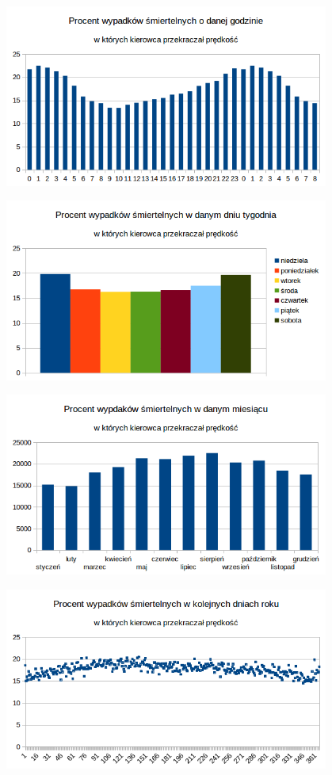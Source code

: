 \centerline{\includegraphics[width=0.8\textwidth]{images/hipotheses/speed/speed_exceeded_by_hour.png}}

\centerline{\includegraphics[width=0.8\textwidth]{images/hipotheses/speed/speed_exceeded_by_day_of_week.png}}

\centerline{\includegraphics[width=0.8\textwidth]{images/hipotheses/speed/speed_exceeded_by_month.png}}

\centerline{\includegraphics[width=0.8\textwidth]{images/hipotheses/speed/speed_exceeded_by_day_of_year.png}}

